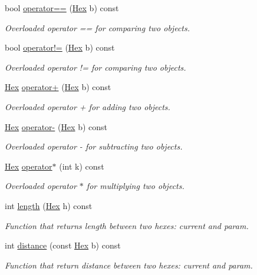 \begin{DoxyCompactItemize}
\item 
bool \hyperlink{classHex_a91a4aaf6c05a7daf2fa4b37274f1cc07}{operator==} (\hyperlink{classHex}{Hex} b) const 
\begin{DoxyCompactList}\small\item\em Overloaded operator == for comparing two objects. \end{DoxyCompactList}\item 
bool \hyperlink{classHex_a6a94e713daf6d64fa3a4b51c387842a0}{operator!=} (\hyperlink{classHex}{Hex} b) const 
\begin{DoxyCompactList}\small\item\em Overloaded operator != for comparing two objects. \end{DoxyCompactList}\item 
\hyperlink{classHex}{Hex} \hyperlink{classHex_a9c560b8ecc36dc56bca3ad473e3b5916}{operator+} (\hyperlink{classHex}{Hex} b) const 
\begin{DoxyCompactList}\small\item\em Overloaded operator + for adding two objects. \end{DoxyCompactList}\item 
\hyperlink{classHex}{Hex} \hyperlink{classHex_ac591a09448fb9ab6a90e33bb7099757c}{operator-\/} (\hyperlink{classHex}{Hex} b) const 
\begin{DoxyCompactList}\small\item\em Overloaded operator -\/ for subtracting two objects. \end{DoxyCompactList}\item 
\hyperlink{classHex}{Hex} \hyperlink{classHex_a93760b2e9ecdecff1e4780b5299dc83a}{operator$\ast$} (int k) const 
\begin{DoxyCompactList}\small\item\em Overloaded operator $\ast$ for multiplying two objects. \end{DoxyCompactList}\item 
int \hyperlink{classHex_a0a53db47c686e369f860914dcd9fbc31}{length} (\hyperlink{classHex}{Hex} h) const 
\begin{DoxyCompactList}\small\item\em Function that returns length between two hexes\+: current and param. \end{DoxyCompactList}\item 
int \hyperlink{classHex_a1826932dd063e77097b801485f67d5b0}{distance} (const \hyperlink{classHex}{Hex} b) const 
\begin{DoxyCompactList}\small\item\em Function that return distance between two hexes\+: current and param. \end{DoxyCompactList}\item 

\end{DoxyCompactItemize}
